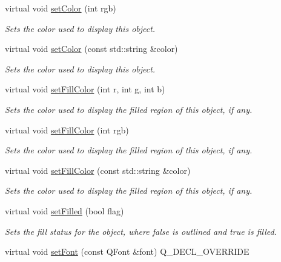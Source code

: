 \begin{DoxyCompactItemize}
virtual void \mbox{\hyperlink{classGObject_ab1f5cc0f5cc6bbbd716a526c61f1081d}{set\+Color}} (int rgb)
\begin{DoxyCompactList}\small\item\em Sets the color used to display this object. \end{DoxyCompactList}\item 
virtual void \mbox{\hyperlink{classGObject_a61374df6c11b52cfbb0815decdbaebc6}{set\+Color}} (const std\+::string \&color)
\begin{DoxyCompactList}\small\item\em Sets the color used to display this object. \end{DoxyCompactList}\item 
virtual void \mbox{\hyperlink{classGObject_ad767a33971159e9493e221cca4c00ae9}{set\+Fill\+Color}} (int r, int g, int b)
\begin{DoxyCompactList}\small\item\em Sets the color used to display the filled region of this object, if any. \end{DoxyCompactList}\item 
virtual void \mbox{\hyperlink{classGObject_aa59d9775a67fa7df2b24a95cd34840a3}{set\+Fill\+Color}} (int rgb)
\begin{DoxyCompactList}\small\item\em Sets the color used to display the filled region of this object, if any. \end{DoxyCompactList}\item 
virtual void \mbox{\hyperlink{classGObject_adbc18b1a930aadd97d7437f9f7265b96}{set\+Fill\+Color}} (const std\+::string \&color)
\begin{DoxyCompactList}\small\item\em Sets the color used to display the filled region of this object, if any. \end{DoxyCompactList}\item 
virtual void \mbox{\hyperlink{classGObject_a9b82b53362282c6bb7d6947068d2e55b}{set\+Filled}} (bool flag)
\begin{DoxyCompactList}\small\item\em Sets the fill status for the object, where {\ttfamily false} is outlined and {\ttfamily true} is filled. \end{DoxyCompactList}\item 
virtual void \mbox{\hyperlink{classGText_a2d22014c7fa3bccfd58c982aea1b55fa}{set\+Font}} (const Q\+Font \&font) Q\+\_\+\+D\+E\+C\+L\+\_\+\+O\+V\+E\+R\+R\+I\+DE

\end{DoxyCompactItemize}
